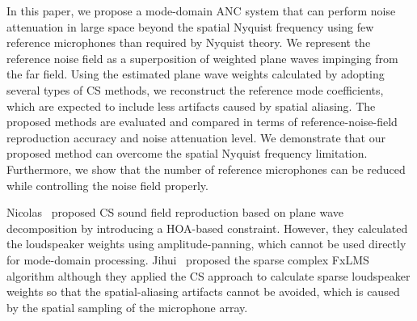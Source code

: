 \documentclass{article}
\begin{document}
In this paper, we propose a mode-domain ANC system that can perform noise attenuation in large space beyond the spatial Nyquist frequency using few reference microphones than required by Nyquist theory.  We represent the reference noise field as a superposition of weighted plane waves impinging from the far field. Using the estimated plane wave weights calculated by adopting several types of CS methods, we reconstruct the reference mode coefficients,
which are expected to include less artifacts caused by spatial aliasing. The proposed methods are evaluated and compared in terms of reference-noise-field reproduction accuracy and noise attenuation level. We demonstrate that our proposed method can overcome the spatial Nyquist frequency limitation. Furthermore, we show that the number of reference microphones can be reduced while controlling the noise field properly.

Nicolas~\cite{epain2009application} proposed CS sound field reproduction based on plane wave decomposition by introducing a HOA-based constraint.
However, they calculated the loudspeaker weights using amplitude-panning, which cannot be used directly for mode-domain processing.
Jihui~\cite{zhangg2016sparse,zhang2016multichannel} proposed the sparse complex FxLMS algorithm although they applied the CS approach to calculate sparse loudspeaker weights so that the spatial-aliasing artifacts cannot be avoided, which is caused by the spatial sampling of the microphone array.



%
\end{document}
